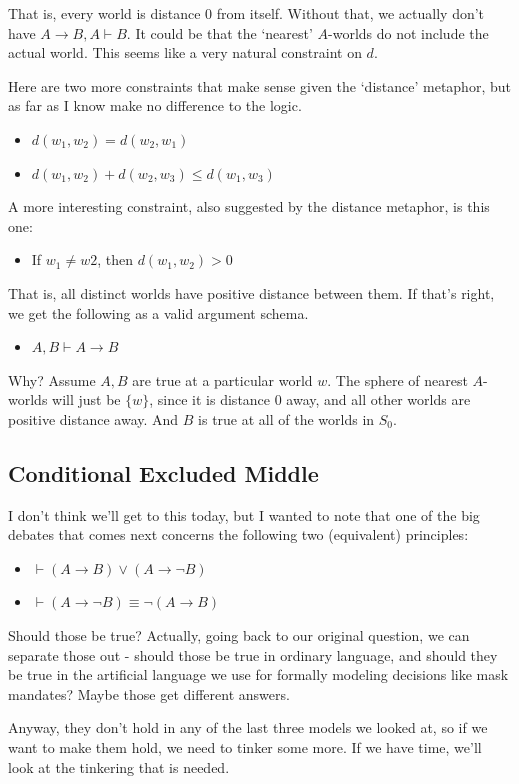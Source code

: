 \documentclass[
]{article}
\providecommand{\tightlist}{%
  \setlength{\itemsep}{0pt}\setlength{\parskip}{0pt}}\usepackage{longtable,booktabs,array}
\begin{document}
That is, every world is distance 0 from itself. Without that, we
actually don't have \(A \rightarrow B, A \vdash B\). It could be that
the `nearest' \(A\)-worlds do not include the actual world. This seems
like a very natural constraint on \(d\).

Here are two more constraints that make sense given the `distance'
metaphor, but as far as I know make no difference to the logic.

\begin{itemize}
\tightlist
\item
  \(d(w_1, w_2) = d(w_2, w_1)\)
\item
  \(d(w_1, w_2) + d(w_2, w_3) \leq d(w_1, w_3)\)
\end{itemize}

A more interesting constraint, also suggested by the distance metaphor,
is this one:

\begin{itemize}
\tightlist
\item
  If \(w_1 \neq w2\), then \(d(w_1, w_2) > 0\)
\end{itemize}

That is, all distinct worlds have positive distance between them. If
that's right, we get the following as a valid argument schema.

\begin{itemize}
\tightlist
\item
  \(A, B \vdash A \rightarrow B\)
\end{itemize}

Why? Assume \(A, B\) are true at a particular world \(w\). The sphere of
nearest \(A\)-worlds will just be \(\{w\}\), since it is distance 0
away, and all other worlds are positive distance away. And \(B\) is true
at all of the worlds in \(S_0\).

\hypertarget{conditional-excluded-middle}{%
\subsection{Conditional Excluded
Middle}\label{conditional-excluded-middle}}

I don't think we'll get to this today, but I wanted to note that one of
the big debates that comes next concerns the following two (equivalent)
principles:

\begin{itemize}
\tightlist
\item
  \(\vdash (A \rightarrow B) \vee (A \rightarrow \neg B)\)
\item
  \(\vdash (A \rightarrow \neg B) \equiv \neg (A \rightarrow B)\)
\end{itemize}

Should those be true? Actually, going back to our original question, we
can separate those out - should those be true in ordinary language, and
should they be true in the artificial language we use for formally
modeling decisions like mask mandates? Maybe those get different
answers.

Anyway, they don't hold in any of the last three models we looked at, so
if we want to make them hold, we need to tinker some more. If we have
time, we'll look at the tinkering that is needed.
\end{document}

